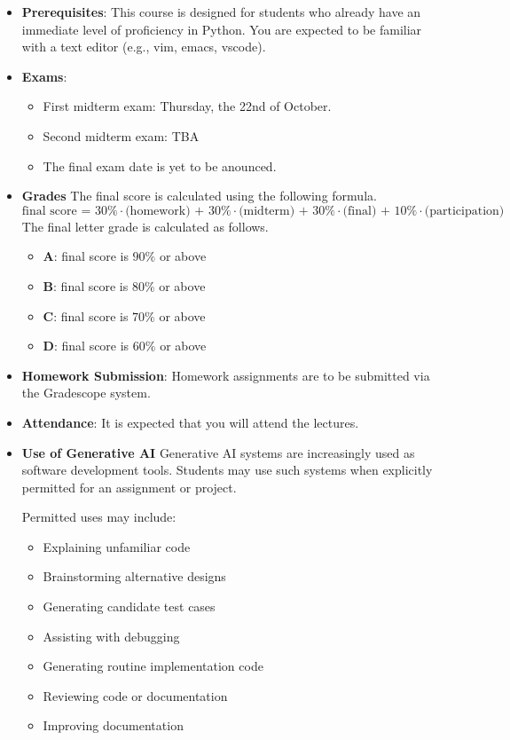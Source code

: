 \documentclass[11pt]{article}
\begin{document}
\begin{itemize}
The central goal of this course is therefore not merely to make
students better programmers. It is to teach students to approach
software development as an **engineering discipline** in which
requirements, design, evidence, tradeoffs, process, and communication
are as important as writing code.

\item {\bf Prerequisites}:
This course is designed for students who already have an immediate
level of proficiency in Python. You are expected to be familiar with a
text editor (e.g., vim, emacs, vscode).

\item {\bf Exams}:
\begin{itemize}
\item
First midterm exam:
Thursday, the 22nd of October.
\item
Second midterm exam: TBA
\item
The final exam date is yet to be anounced.
\end{itemize}

\item {\bf Grades}
The final score is calculated using the following formula.
\[\mbox{final score = 30\%$\cdot$(homework) + 30\%$\cdot$(midterm) + 30\%$\cdot$(final) + 10\%$\cdot$(participation)}\]
The final letter grade is calculated as follows.
\begin{itemize}
\item{\bf A}: final score is $90\%$ or above
\item{\bf B}: final score is $80\%$ or above
\item{\bf C}: final score is $70\%$ or above
\item{\bf D}: final score is $60\%$ or above
\end{itemize}

\item
{\bf Homework Submission}:
Homework assignments are to be submitted via the Gradescope system.

\item
{\bf Attendance}:
It is expected that you will attend the lectures.

\item
{\bf Use of Generative AI}
Generative AI systems are increasingly used as software development
tools. Students may use such systems when explicitly permitted for an
assignment or project.

Permitted uses may include:
\begin{itemize}
\item Explaining unfamiliar code
\item Brainstorming alternative designs
\item Generating candidate test cases
\item Assisting with debugging
\item Generating routine implementation code
\item Reviewing code or documentation
\item Improving documentation
\end{itemize}


\end{itemize}
\end{document}
